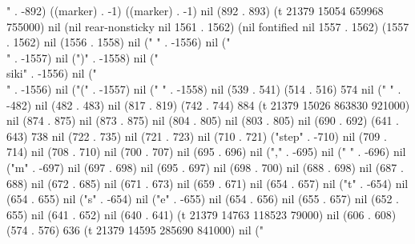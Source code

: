 " . -892) ((marker) . -1) ((marker) . -1) nil (892 . 893) (t 21379 15054 659968 755000) nil (nil rear-nonsticky nil 1561 . 1562) (nil fontified nil 1557 . 1562) (1557 . 1562) nil (1556 . 1558) nil (" " . -1556) nil ("\\" . -1557) nil (")" . -1558) nil ("\\siki" . -1556) nil ("\\" . -1556) nil ("(" . -1557) nil (" " . -1558) nil (539 . 541) (514 . 516) 574 nil (" " . -482) nil (482 . 483) nil (817 . 819) (742 . 744) 884 (t 21379 15026 863830 921000) nil (874 . 875) nil (873 . 875) nil (804 . 805) nil (803 . 805) nil (690 . 692) (641 . 643) 738 nil (722 . 735) nil (721 . 723) nil (710 . 721) ("step" . -710) nil (709 . 714) nil (708 . 710) nil (700 . 707) nil (695 . 696) nil ("," . -695) nil (" " . -696) nil ("m" . -697) nil (697 . 698) nil (695 . 697) nil (698 . 700) nil (688 . 698) nil (687 . 688) nil (672 . 685) nil (671 . 673) nil (659 . 671) nil (654 . 657) nil ("t" . -654) nil (654 . 655) nil ("s" . -654) nil ("e" . -655) nil (654 . 656) nil (655 . 657) nil (652 . 655) nil (641 . 652) nil (640 . 641) (t 21379 14763 118523 79000) nil (606 . 608) (574 . 576) 636 (t 21379 14595 285690 841000) nil ("%
